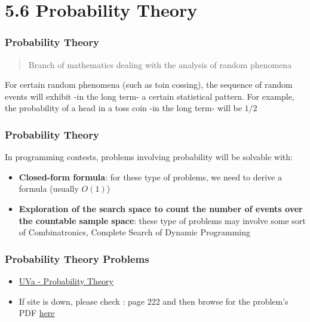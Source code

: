 \documentclass{beamer}
\begin{document}
\section{5.6 Probability Theory}

\begin{frame}[fragile]
\frametitle{Probability Theory}

\begin{quote}
    Branch of mathematics dealing with the analysis of random phenomena
\end{quote}

\vspace{0.3cm}

For certain random phenomena (such as toin cossing), the sequence of random events will exhibit -in the long term- a certain statistical pattern. For example, the probability of a head in a toss coin -in the long term- will be $1/2$

\end{frame}

\begin{frame}[fragile]
\frametitle{Probability Theory}

In programming contests, problems involving probability will be solvable with:

\begin{itemize}
    \item \textbf{Closed-form formula}: for these type of problems, we need to derive a formula (usually $O(1)$)
    \item \textbf{Exploration of the search space to count the number of events over the countable sample space}: these type of problems may involve some sort of Combinatronics, Complete Search of Dynamic Programming
\end{itemize}

\end{frame}

\begin{frame}[fragile]
\frametitle{Probability Theory Problems}

\begin{itemize}
    \item \href{https://onlinejudge.org/index.php?option=com_onlinejudge&Itemid=8&category=730}{UVa - Probability Theory}
    \item If site is down, please check \cite{Halim}: page 222 and then browse for the problem's PDF \href{https://cpbook.net/methodstosolve}{here}
\end{itemize}

\end{frame}
\end{document}
